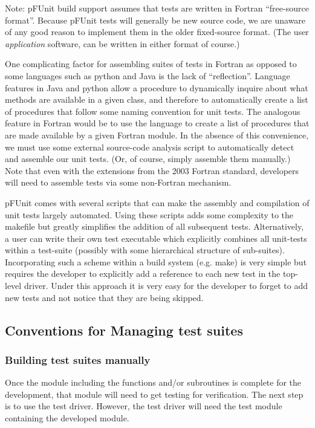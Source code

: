 \documentclass[10pt]{article}
\newcommand{\pfunit}{{\sc pFUnit }}
\begin{document}
Note: \pfunit build support assumes that tests are written in Fortran
``free-source format''.  Because \pfunit tests will generally be new
source code, we are unaware of any good reason to implement them in
the older fixed-source format.  (The user \emph{application} software,
can be written in either format of course.)

One complicating factor for assembling suites of tests in Fortran as
opposed to some languages such as python and Java is the lack of
``reflection''.  Language features in Java and python allow a
procedure to dynamically inquire about what methods are available in a
given class, and therefore to automatically create a list of
procedures that follow some naming convention for unit tests.  The
analogous feature in Fortran would be to use the language to create a
list of procedures that are made available by a given Fortran module.
In the absence of this convenience, we must use some external
source-code analysis script to automatically detect and assemble our
unit tests.  (Or, of course, simply assemble them manually.)  Note
that even with the extensions from the 2003 Fortran standard,
developers will need to assemble tests via some non-Fortran mechanism.

\pfunit comes with several scripts that can make the assembly and
compilation of unit tests largely automated.  Using these scripts adds
some complexity to the makefile but greatly simplifies the addition of
all subsequent tests.  Alternatively, a user can write their own test
executable which explicitly combines all unit-tests within a
test-suite (possibly with some hierarchical structure of sub-suites).
Incorporating such a scheme within a build system (e.g. make) is very
simple but requires the developer to explicitly add a reference to
each new test in the top-level driver.  Under this approach it is very
easy for the developer to forget to add new tests and not notice that
they are being skipped.



\subsection{Conventions for Managing test suites}

\subsubsection{Building test suites manually}
Once the module including the functions and/or subroutines is complete
for the development, that module will need to get testing for
verification.  The next step is to use the test driver.  However, the
test driver will need the test module containing the developed module.
\end{document}
